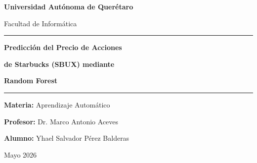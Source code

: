 \documentclass[12pt,a4paper]{article}
\begin{document}
\begin{titlepage}
    \centering
    \vspace*{2cm}
    
    {\LARGE\bfseries\color{themeColor} Universidad Autónoma de Querétaro\par}
    \vspace{0.5cm}
    {\large Facultad de Informática\par}
    \vspace{1.5cm}
    
    \rule{\textwidth}{1.5pt}\par
    \vspace{0.5cm}
    {\huge\bfseries Predicción del Precio de Acciones\par}
    {\huge\bfseries de Starbucks (SBUX) mediante\par}
    {\huge\bfseries Random Forest\par}
    \vspace{0.3cm}
    \rule{\textwidth}{1.5pt}\par
    \vspace{1.5cm}
    
    {\large\textbf{Materia:} Aprendizaje Automático\par}
    \vspace{0.5cm}
    {\large\textbf{Profesor:} Dr. Marco Antonio Aceves\par}
    \vspace{0.5cm}
    {\large\textbf{Alumno:} Yhael Salvador Pérez Balderas\par}
    \vspace{1.5cm}
    
    \vfill
    {\large Mayo 2026\par}
\end{titlepage}

\begin{abstract}
En este trabajo se implement\'o un modelo de \textit{Random Forest} para predecir el retorno logar\'{\i}tmico (\textit{log\_return}) de las acciones de Starbucks (SBUX). Se utilizaron 250 registros diarios del per\'{\i}odo febrero 2025 a enero 2026, con caracter\'{\i}sticas derivadas de precio y volumen (rango diario, volatilidad, volumen transformado, rezagos y variables temporales). El mejor modelo, optimizado mediante validaci\'on temporal, alcanz\'o un $R^{2}$ de 0.028 y un RMSE de 0.0171 en el conjunto de prueba, superando al modelo ingenuo de predecir la media. Si bien el poder predictivo es limitado ---consistente con la hip\'otesis de mercado eficiente--- los resultados demuestran que es posible capturar una fracci\'on de la varianza de los retornos diarios utilizando exclusivamente datos hist\'oricos de precios.
\end{abstract}
\end{document}
